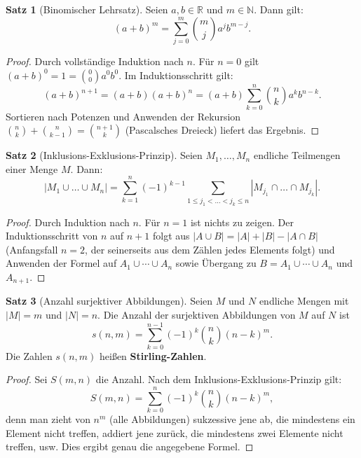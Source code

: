 ﻿\documentclass[a4paper,12pt]{report}
\theoremstyle{definition}
\newtheorem{satz}{Satz}
\begin{document}
\begin{satz}[Binomischer Lehrsatz]
    Seien $a, b \in \mathbb{R}$ und $m \in \mathbb{N}$. Dann gilt:
    \[
        (a + b)^m = \sum_{j=0}^{m} \binom{m}{j} a^j b^{m-j}.
    \]
\end{satz}
\begin{proof}
    Durch vollständige Induktion nach $n$. Für $n = 0$ gilt $(a+b)^0 = 1 = \binom{0}{0}a^0 b^0$.
    Im Induktionsschritt gilt:
    \[
        (a+b)^{n+1} = (a+b)(a+b)^n = (a+b)\sum_{k=0}^n \binom{n}{k} a^k b^{n-k}.
    \]
    Sortieren nach Potenzen und Anwenden der Rekursion
    $\binom{n}{k} + \binom{n}{k-1} = \binom{n+1}{k}$ (Pascalsches Dreieck)
    liefert das Ergebnis.
\end{proof}


\begin{satz}[Inklusions-Exklusions-Prinzip]
    Seien $M_1, \dots, M_n$ endliche Teilmengen einer Menge $M$. Dann:
    \[
        |M_1 \cup \dots \cup M_n|
        = \sum_{k=1}^{n} (-1)^{k-1}
        \sum_{1 \le j_1 < \dots < j_k \le n} |M_{j_1} \cap \dots \cap M_{j_k}|.
    \]
\end{satz}
\begin{proof}
    Durch Induktion nach $n$. Für $n = 1$ ist nichts zu zeigen. Der Induktionsschritt
    von $n$ auf $n+1$ folgt aus $|A \cup B| = |A| + |B| - |A \cap B|$ (Anfangsfall $n=2$,
    der seinerseits aus dem Zählen jedes Elements folgt) und Anwenden der Formel
    auf $A_1 \cup \cdots \cup A_n$ sowie Übergang zu $B = A_1 \cup \cdots \cup A_n$
    und $A_{n+1}$.
\end{proof}


\begin{satz}[Anzahl surjektiver Abbildungen]
    Seien $M$ und $N$ endliche Mengen mit $|M| = m$ und $|N| = n$. Die Anzahl
    der surjektiven Abbildungen von $M$ auf $N$ ist
    \[
        s(n, m) = \sum_{k=0}^{n-1} (-1)^k \binom{n}{k} (n-k)^m.
    \]
    Die Zahlen $s(n, m)$ heißen \textbf{Stirling-Zahlen}.
\end{satz}
\begin{proof}
    Sei $S(m, n)$ die Anzahl. Nach dem Inklusions-Exklusions-Prinzip gilt:
    \[
        S(m, n) = \sum_{k=0}^n (-1)^k \binom{n}{k} (n-k)^m,
    \]
    denn man zieht von $n^m$ (alle Abbildungen) sukzessive jene ab, die mindestens
    ein Element nicht treffen, addiert jene zurück, die mindestens zwei Elemente
    nicht treffen, usw. Dies ergibt genau die angegebene Formel.
\end{proof}
\end{document}

